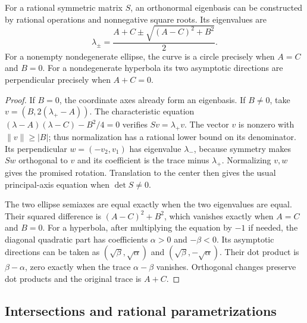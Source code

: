 \begin{theorem}
\label{con:axes}
For a rational symmetric matrix $S$, an orthonormal eigenbasis can be
constructed by rational operations and nonnegative square roots. Its
eigenvalues are
\[
 \lambda_\pm=\frac{A+C\pm\sqrt{(A-C)^2+B^2}}2.
\]
For a nonempty nondegenerate ellipse, the curve is a circle precisely
when $A=C$ and $B=0$. For a nondegenerate hyperbola its two asymptotic
directions are perpendicular precisely when $A+C=0$.
\end{theorem}
\begin{proof}
If $B=0$, the coordinate axes already form an eigenbasis. If $B\ne0$,
take $v=(B,2(\lambda_+-A))$. The characteristic equation
$(\lambda-A)(\lambda-C)-B^2/4=0$ verifies $Sv=\lambda_+v$.
The vector $v$ is nonzero with $\|v\|\ge |B|$; thus normalization has
a rational lower bound on its denominator. Its perpendicular
$w=(-v_2,v_1)$ has eigenvalue $\lambda_-$, because symmetry makes $Sw$
orthogonal to $v$ and its coefficient is the trace minus $\lambda_+$.
Normalizing $v,w$ gives the promised rotation. Translation to the center
then gives the usual principal-axis equation when $\det S\ne0$.

The two ellipse semiaxes are equal exactly when the two eigenvalues are
equal. Their squared difference is $(A-C)^2+B^2$, which vanishes exactly
when $A=C$ and $B=0$. For a hyperbola, after multiplying the equation
by $-1$ if needed, the diagonal quadratic part has coefficients
$\alpha>0$ and $-\beta<0$. Its asymptotic directions can be taken as
$(\sqrt\beta,\sqrt\alpha)$ and $(\sqrt\beta,-\sqrt\alpha)$.
Their dot product is $\beta-\alpha$, zero exactly when the trace
$\alpha-\beta$ vanishes. Orthogonal changes preserve dot products and
the original trace is $A+C$.
\end{proof}

\subsection{Intersections and rational parametrizations}

